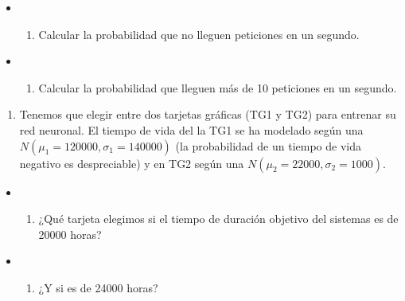 \documentclass[
]{article}
\providecommand{\tightlist}{%
  \setlength{\itemsep}{0pt}\setlength{\parskip}{0pt}}
\begin{document}
\begin{itemize}
\item
  \begin{enumerate}
  \def\labelenumi{\alph{enumi})}
  \tightlist
  \item
    Calcular la probabilidad que no lleguen peticiones en un segundo.
  \end{enumerate}
\item
  \begin{enumerate}
  \def\labelenumi{\alph{enumi})}
  \setcounter{enumi}{1}
  \tightlist
  \item
    Calcular la probabilidad que lleguen más de 10 peticiones en un
    segundo.
  \end{enumerate}
\end{itemize}

\begin{enumerate}
\def\labelenumi{\arabic{enumi}.}
\setcounter{enumi}{7}
\tightlist
\item
  Tenemos que elegir entre dos tarjetas gráficas (TG1 y TG2) para
  entrenar su red neuronal. El tiempo de vida del la TG1 se ha modelado
  según una \(N(\mu_1=120000, \sigma_1=140000)\) (la probabilidad de un
  tiempo de vida negativo es despreciable) y en TG2 según una
  \(N(\mu_2=22000, \sigma_2=1000)\).
\end{enumerate}

\begin{itemize}
\item
  \begin{enumerate}
  \def\labelenumi{\alph{enumi})}
  \tightlist
  \item
    ¿Qué tarjeta elegimos si el tiempo de duración objetivo del sistemas
    es de 20000 horas?
  \end{enumerate}
\item
  \begin{enumerate}
  \def\labelenumi{\alph{enumi})}
  \setcounter{enumi}{1}
  \tightlist
  \item
    ¿Y si es de 24000 horas?
  \end{enumerate}
\end{itemize}
\end{document}
